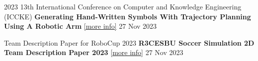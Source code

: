 
\begin{cventries}
    \cventry
    {2023 13th International Conference on Computer and Knowledge Engineering (ICCKE)}
    {\textbf {Generating Hand-Written Symbols With Trajectory Planning Using A Robotic Arm}
    \href{https://ieeexplore.ieee.org/document/10326253}{\textcolor{cobalt}{[more info]}}}
    {}
    {27 Nov 2023}
    {}
    \vspace{0.2 cm}

    
\end{cventries}

\begin{cventries}
    \cventry
    {Team Description Paper for RoboCup 2023}
    {\textbf {R3CESBU Soccer Simulation 2D Team Description Paper 2023}
    \href{https://archive.robocup.info/Soccer/Simulation/2D/TDPs/RoboCup/2023/R3CESBU_SS2D_RC2023_TDP.pdf}{\textcolor{cobalt}{[more info]}}}
    {}
    {27 Nov 2023}
    {}
    \vspace{0.35 cm}
\end{cventries}

\vspace{0.5 cm}
